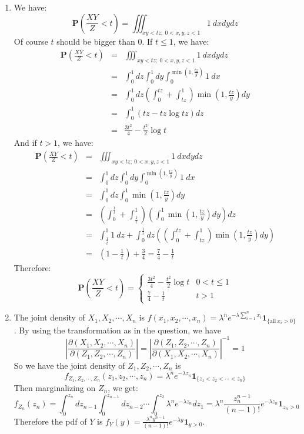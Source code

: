 \documentclass[12pt]{article}
\newcommand{\prob}[1]{\textbf{P}(#1)}
\begin{document}
\begin{enumerate}
    \item 
    We have: 
       $$\prob{\frac{XY}{Z} < t} = \iiint_{xy<tz;\ 0<x,y,z<1} 1\ d x d y d z $$
    Of course $t$ should be bigger than $0$. If $t \le 1$, we have:
    \begin{eqnarray}
        \prob{\frac{XY}{Z} < t} &=& \iiint_{xy<tz;\ 0<x,y,z<1} 1\ d x d y d z \\
                                &=& \int_0^1 dz \int_0^1 dy \int_0^{\min(1,\frac{tz}{y})} 1\ dx \\
                                &=& \int_0^1 dz (\int_0^{tz} + \int_{tz}^1) \min(1,\frac{tz}{y}) dy \\
                                &=& \int_0^1 (tz - tz\log{tz}) dz \\
                                &=& \frac{3 t^2}{4} - \frac{t^2}{2}\log{t}
    \end{eqnarray}
    And if $t > 1$, we have:
    \begin{eqnarray}
        \prob{\frac{XY}{Z} < t} &=& \iiint_{xy<tz;\ 0<x,y,z<1} 1\ d x d y d z \\
                                &=& \int_0^1 dz \int_0^1 dy \int_0^{\min(1,\frac{tz}{y})} 1\ dx \\
                                &=& \int_0^1 dz \int_0^1 \min(1,\frac{tz}{y}) dy \\
                                &=& (\int_0^{\frac{1}{t}} + \int_{\frac{1}{t}}^1) (\int_0^1 \min(1,\frac{tz}{y}) dy) dz \\
                                &=& \int_{\frac{1}{t}}^1 1\ dz + \int_0^{\frac{1}{t}} dz ((\int_0^{tz} + \int_{tz}^1) \min(1,\frac{tz}{y}) dy) \\
                                &=& (1 - \frac{1}{t}) + \frac{3}{4} = \frac{7}{4} - \frac{1}{t}
    \end{eqnarray}
    Therefore:
    $$ \prob{\frac{XY}{Z} < t} = \begin{cases}
                                    \frac{3 t^2}{4} - \frac{t^2}{2}\log{t} & 0< t \le 1 \\
                                    \frac{7}{4} - \frac{1}{t} & t > 1  
                                \end{cases}$$

    \item
    The joint density of $X_1, X_2,\cdots, X_n$ is $f(x_1,x_2,\cdots,x_n) = \lambda^n e^{-\lambda \sum_{i=1}^n x_i} \bm{1}_{\{\text{all}\ x_i > 0\}}$.
    By using the transformation as in the question, we have 
    $$|\frac{\partial(X_1,X_2,\cdots,X_n)}{\partial(Z_1,Z_2,\cdots,Z_n)}| = |\frac{\partial(Z_1,Z_2,\cdots,Z_n)}{\partial(X_1,X_2,\cdots,X_n)}|^{-1} = 1$$
    So we have the joint density of $Z_1,Z_2,\cdots,Z_n$ is 
    $$f_{Z_1,Z_2,\cdots,Z_n}(z_1,z_2,\cdots,z_n) = \lambda^n e^{-\lambda z_n} \bm{1}_{\{z_1 < z_2 < \cdots < z_n\}}$$
    Then marginalizing on $Z_n$, we get:
    $$f_{Z_n}(z_n) = \int_0^{z_n} dz_{n-1} \int_0^{z_{n-1}} dz_{n-2} \cdots \int_0^{z_2} \lambda^n e^{-\lambda z_n} dz_1 = \lambda^n \frac{z_n^{n-1}}{(n-1)!} e^{-\lambda z_n} \bm{1}_{z_n>0}$$
    Therefore the pdf of $Y$ is $f_Y(y) = \frac{\lambda^n y^{n-1}}{(n-1)!} e^{-\lambda y} \bm{1}_{y>0}$.


\end{enumerate}
\end{document}
